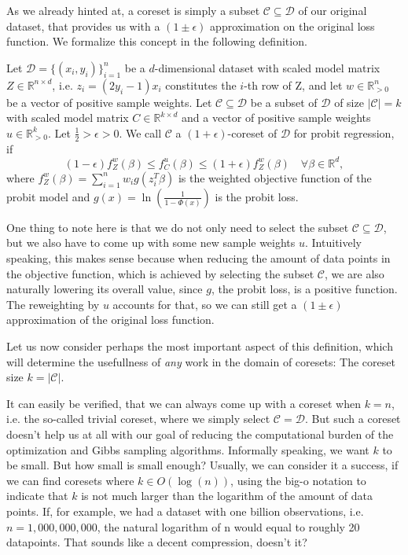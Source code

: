 As we already hinted at, a coreset is simply a subset
$\mathcal{C} \subseteq \mathcal{D}$ of our original dataset,
that provides us with a $(1 \pm \epsilon)$ approximation
on the original loss function.
We formalize this concept in the following definition.

\begin{definition}[Coreset]
    \label{def:coreset}
    Let $\mathcal{D}=\{(x_i, y_i)\}_{i=1}^n$ be a $d$-dimensional dataset
    with scaled model matrix $Z \in \mathbb{R}^{n \times d}$,
    i.e. $z_i = (2y_i - 1)x_i$ constitutes the $i$-th
    row of Z, and let $w \in \mathbb{R}_{>0}^n$ be
    a vector of positive sample weights.
    Let $\mathcal{C} \subseteq \mathcal{D}$ be a subset of $\mathcal{D}$
    of size $|\mathcal{C}| = k$
    with scaled model matrix $C \in \mathbb{R}^{k \times d}$ and
    a vector of positive sample weights $u \in \mathbb{R}_{>0}^k$.
    Let $\frac{1}{2} > \epsilon > 0$.
    We call $\mathcal{C}$ a $(1+\epsilon)$-coreset of $\mathcal{D}$
    for probit regression, if
    \begin{equation*}
        (1-\epsilon)f_Z^w(\beta) \leq f_C^u(\beta) \leq (1+\epsilon)f_Z^w(\beta)
        \quad \forall \beta \in \mathbb{R}^d,
    \end{equation*}
    where $f_Z^w(\beta) = \sum_{i=1}^n w_i g(z_i^T \beta)$ is the
    weighted objective function of the probit model
    and $g(x) = \ln \left( \frac{1}{1 - \Phi(x)} \right)$ is the
    probit loss.
\end{definition}

One thing to note here is that we do not only need to select the
subset $\mathcal{C} \subseteq \mathcal{D}$, but we also have to come
up with some new sample weights $u$.
Intuitively speaking, this makes sense because when reducing the
amount of data points in the objective function, which is
achieved by selecting the subset $\mathcal{C}$, we are
also naturally lowering its overall value, since $g$, the
probit loss, is a positive function. The reweighting
by $u$ accounts for that, so we can still get a $(1 \pm \epsilon)$
approximation of the original loss function.

Let us now consider perhaps the most important aspect of this definition,
which will determine the usefullness of \textit{any} work in the
domain of coresets: The coreset size $k = |\mathcal{C}|$.

It can easily be verified, that we can always come up with a coreset
when $k = n$, i.e. the so-called trivial coreset, where
we simply select $\mathcal{C} = \mathcal{D}$.
But such a coreset doesn't help us at all with our goal of reducing the
computational burden of the optimization and Gibbs sampling algorithms.
Informally speaking, we want $k$ to be small. But how small
is small enough? Usually, we can consider it a success, if we
can find coresets where $k \in O(\log(n))$, using the big-o notation
to indicate that $k$ is not much larger than the logarithm
of the amount of data points. If, for example, we had
a dataset with one billion observations, i.e. $n = 1,000,000,000$,
the natural logarithm of n would equal to roughly 20 datapoints.
That sounds like a decent compression, doesn't it?

